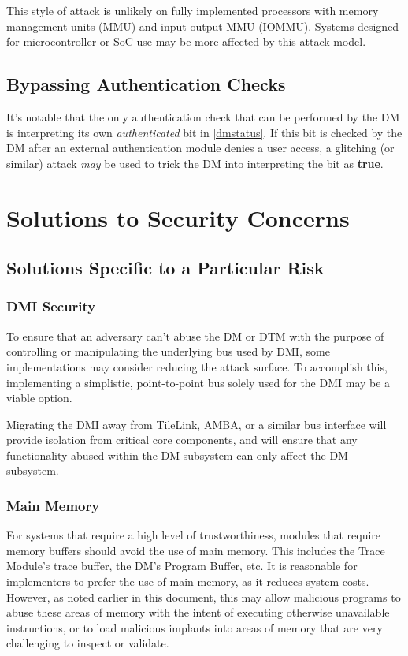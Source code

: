 This style of attack is unlikely on fully implemented processors with memory management units (MMU) and input-output MMU (IOMMU). Systems designed for microcontroller or SoC use may be more affected by this attack model. 

\subsection{Bypassing Authentication Checks}
It's notable that the only authentication check that can be performed by the DM is interpreting its own {\em authenticated} bit in \ref{dmstatus}. If this bit is checked by the DM after an external authentication module denies a user access, a glitching (or similar) attack {\em may} be used to trick the DM into interpreting the bit as {\bf true}.

\section{Solutions to Security Concerns}

\subsection{Solutions Specific to a Particular Risk}

\subsubsection{DMI Security}
To ensure that an adversary can't abuse the DM or DTM with the purpose of controlling or manipulating the underlying bus used by DMI, some implementations may consider reducing the attack surface. To accomplish this, implementing a simplistic, point-to-point bus solely used for the DMI may be a viable option. 

Migrating the DMI away from TileLink, AMBA, or a similar bus interface will provide isolation from critical core components, and will ensure that any functionality abused within the DM subsystem can only affect the DM subsystem. 

\subsubsection{Main Memory}
For systems that require a high level of trustworthiness, modules that require memory buffers should avoid the use of main memory. This includes the Trace Module's trace buffer, the DM's Program Buffer, etc. It is reasonable for implementers to prefer the use of main memory, as it reduces system costs. However, as noted earlier in this document, this may allow malicious programs to abuse these areas of memory with the intent of executing otherwise unavailable instructions, or to load malicious implants into areas of memory that are very challenging to inspect or validate. 

